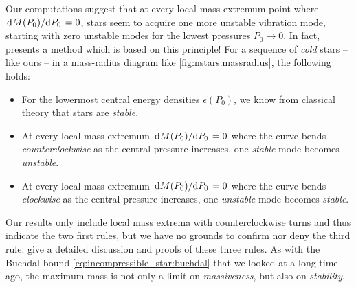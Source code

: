 Our computations suggest that at every local mass extremum point where $\odv{M(P_0)}/{P_0} = 0$, stars seem to acquire one more unstable vibration mode, starting with zero unstable modes for the lowest pressures $P_0 \rightarrow 0$.
In fact, \cite{ref:stability_methods} presents a method which is based on this principle!
For a sequence of \emph{cold} stars -- like ours -- in a mass-radius diagram like \cref{fig:nstars:massradius}, the following holds:
\begin{itemize}
\item For the lowermost central energy densities $\epsilon(P_0)$, we know from classical theory that stars are \emph{stable}.
\item At every local mass extremum $\odv{M(P_0)}/{P_0} = 0$ where the curve bends \emph{counterclockwise} as the central pressure increases, one \emph{stable} mode becomes \emph{unstable}.
\item At every local mass extremum $\odv{M(P_0)}/{P_0} = 0$ where the curve bends \emph{clockwise} as the central pressure increases, one \emph{unstable} mode becomes \emph{stable}.
\end{itemize}
Our results only include local mass extrema with counterclockwise turns and thus indicate the two first rules, but we have no grounds to confirm nor deny the third rule.
\cite{ref:stability_rules_thorne} give a detailed discussion and proofs of these three rules.
As with the Buchdal bound \eqref{eq:incompressible_star:buchdal} that we looked at a long time ago, the maximum mass is not only a limit on \emph{massiveness}, but also on \emph{stability}.


